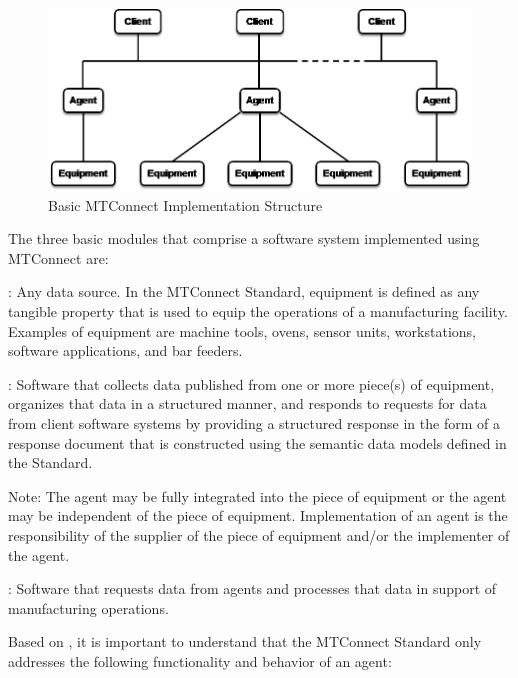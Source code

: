 \begin{figure}[ht]
  \centering
  \includegraphics[width=1.0\textwidth]{figures/basic-mtconnect-implementation-structure.png}
  \caption{Basic MTConnect Implementation Structure}
  \label{fig:basic-mtconnect-implementation-structure}
\end{figure}

\FloatBarrier

The three basic modules that comprise a software system implemented using MTConnect are:

:  Any data source.  In the MTConnect Standard, equipment is defined as any tangible property that is used to equip the operations of a manufacturing facility.  Examples of equipment are machine tools, ovens, sensor units, workstations, software applications, and bar feeders.

:  Software that collects data published from one or more piece(s) of equipment, organizes that data in a structured manner, and responds to requests for data from client software systems by providing a structured response in the form of a \gls{response document} that is constructed using the \glspl{semantic data model} defined in the Standard. 

\begin{note}
Note:	The \gls{agent} may be fully integrated into the piece of equipment or the \gls{agent} may be independent of the piece of equipment.  Implementation of an \gls{agent} is the responsibility of the supplier of the piece of equipment and/or the implementer of the \gls{agent}.
\end{note}
    
:  Software that requests data from \glspl{agent} and processes that data in support of manufacturing operations. 

Based on , it is important to understand that the MTConnect Standard only addresses the following functionality and behavior of an \gls{agent}:

